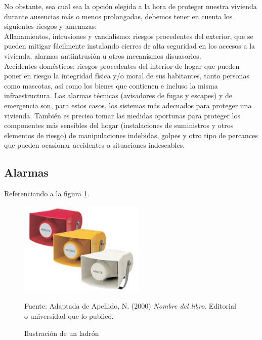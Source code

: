 No obstante, sea cual sea la opción elegida a la hora de proteger nuestra vivienda durante ausencias más o menos prolongadas, debemos tener en cuenta los siguientes riesgos y amenazas:\\

Allanamientos, intrusiones y vandalismo: riesgos procedentes del exterior, que se pueden mitigar fácilmente instalando cierres de alta seguridad en los accesos a la vivienda, alarmas antiintrusión u otros mecanismos disuasorios.\\

Accidentes domésticos: riesgos procedentes del interior de hogar que pueden poner en riesgo la integridad física y/o moral de sus habitantes, tanto personas como mascotas, así como los bienes que contienen e incluso la misma infraestructura. Las alarmas técnicas (avisadores de fugas y escapes) y de emergencia son, para estos casos, los sistemas más adecuados para proteger una vivienda. También es preciso tomar las medidas oportunas para proteger los componentes más sensibles del hogar (instalaciones de suministros y otros elementos de riesgo) de manipulaciones indebidas, golpes y otro tipo de percances que pueden ocasionar accidentes o situaciones indeseables.

\subsection{Alarmas}
Referenciando a la figura \ref{fig:ejemplo}.
\begin{figure}[H]
    \begin{center}
        \includegraphics[width=6cm]{img/capitulo_3/alarmas.jpg}
    \end{center}
    \caption{Ilustración de un ladrón}
    Fuente: Adaptada de Apellido, N. (2000) \textit{Nombre del libro}.
    Editorial o universidad que lo publicó.
    \label{fig:ejemplo}
\end{figure}

